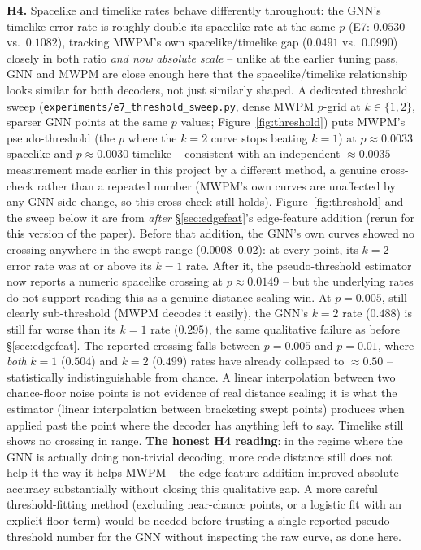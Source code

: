\documentclass[11pt]{article}
\begin{document}
\textbf{H4.} \label{sec:h4} Spacelike and timelike rates behave differently
throughout: the GNN's timelike error rate is roughly double its spacelike
rate at the same $p$ (E7: $0.0530$ vs.\ $0.1082$), tracking MWPM's own
spacelike/timelike gap ($0.0491$ vs.\ $0.0990$) closely in both ratio
\emph{and now absolute scale} -- unlike at the earlier tuning pass, GNN and
MWPM are close enough here that the spacelike/timelike relationship looks
similar for both decoders, not just similarly shaped. A dedicated threshold
sweep (\texttt{experiments/e7\_threshold\_sweep.py}, dense MWPM $p$-grid at
$k\in\{1,2\}$, sparser GNN points at the same $p$ values;
Figure~\ref{fig:threshold}) puts MWPM's pseudo-threshold (the $p$ where the
$k=2$ curve stops beating $k=1$) at $p \approx 0.0033$ spacelike and
$p \approx 0.0030$ timelike -- consistent with an independent
$\approx 0.0035$ measurement made earlier in this project by a different
method, a genuine cross-check rather than a repeated number (MWPM's own
curves are unaffected by any GNN-side change, so this cross-check still
holds). Figure~\ref{fig:threshold} and the sweep below it are from
\emph{after} \S\ref{sec:edgefeat}'s edge-feature addition (rerun for this
version of the paper). Before that addition, the GNN's own curves showed no
crossing anywhere in the swept range ($0.0008$--$0.02$): at every point,
its $k=2$ error rate was at or above its $k=1$ rate. After it, the
pseudo-threshold estimator now reports a numeric spacelike crossing at
$p \approx 0.0149$ -- but the underlying rates do not support reading this
as a genuine distance-scaling win. At $p=0.005$, still clearly
sub-threshold (MWPM decodes it easily), the GNN's $k=2$ rate ($0.488$) is
still far worse than its $k=1$ rate ($0.295$), the same qualitative failure
as before \S\ref{sec:edgefeat}. The reported crossing falls between
$p=0.005$ and $p=0.01$, where \emph{both} $k=1$ ($0.504$) and $k=2$
($0.499$) rates have already collapsed to $\approx 0.50$ -- statistically
indistinguishable from chance. A linear interpolation between two
chance-floor noise points is not evidence of real distance scaling; it is
what the estimator (linear interpolation between bracketing swept points)
produces when applied past the point where the decoder has anything left
to say. Timelike still shows no crossing in range. \textbf{The honest H4
reading}: in the regime where the GNN is actually doing non-trivial
decoding, more code distance still does not help it the way it helps
MWPM -- the edge-feature addition improved absolute accuracy substantially
without closing this qualitative gap. A more careful threshold-fitting
method (excluding near-chance points, or a logistic fit with an explicit
floor term) would be needed before trusting a single reported
pseudo-threshold number for the GNN without inspecting the raw curve, as
done here.
\end{document}
